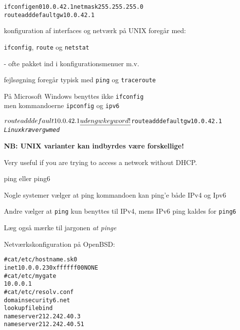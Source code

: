 \documentclass[Screen16to9,17pt]{foils}
\begin{document}


\begin{alltt}
ifconfig en0 10.0.42.1 netmask 255.255.255.0
route add default gw 10.0.42.1
\end{alltt}

\begin{list1}
\item konfiguration af interfaces og netværk på UNIX foregår med:
\item \verb+ifconfig+, \verb+route+ og \verb+netstat+
\item - ofte pakket ind i konfigurationsmenuer m.v.
\item fejlsøgning foregår typisk med \verb+ping+ og \verb+traceroute+
\item På Microsoft Windows benyttes ikke \verb+ifconfig+\\
men kommandoerne \verb+ipconfig+ og \verb+ipv6+
\end{list1}



\begin{alltt}
$ route add default 10.0.42.1
\emph{uden gw keyword!}

$ route add default gw 10.0.42.1
\emph{Linux kræver gw med}
\end{alltt}

\vskip 1cm

\centerline{\bf NB: UNIX varianter kan indbyrdes være forskellige!}

\vskip 1cm

Very useful if you are trying to access a network without DHCP.



\vskip 1cm
\centerline{ping eller ping6}

\begin{list1}
\item Nogle systemer vælger at ping kommandoen kan ping'e både IPv4 og Ipv6
\item Andre vælger at \verb+ping+ kun benyttes til IPv4, mens IPv6 ping kaldes for \verb+ping6+
\item Læg også mærke til jargonen \emph{at pinge}
\end{list1}



Netværkskonfiguration på OpenBSD:
\begin{alltt}
# cat /etc/hostname.sk0
inet 10.0.0.23 0xffffff00 NONE
# cat /etc/mygate
10.0.0.1
# cat /etc/resolv.conf
domain security6.net
lookup file bind
nameserver 212.242.40.3
nameserver 212.242.40.51
\end{alltt}
\end{document}
